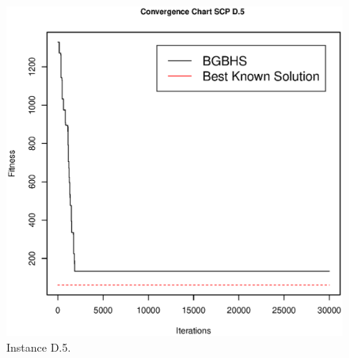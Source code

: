 \begin{figure}[]
\centering
\includegraphics[scale=.45]{Resultados/scpD5.eps}
\caption{Instance D.5.}
\label{fig:Instance.D.5}
\end{figure}